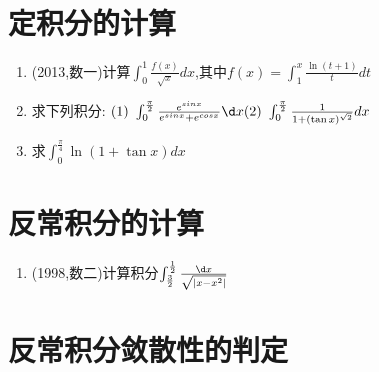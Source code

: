 \documentclass[12pt, a4paper, oneside, UTF8]{ctexbook}
\begin{document}
\section{ 定积分的计算}

\begin{enumerate}[label=\arabic*.,start=7]
    \item (2013,数一)计算$\int_0^1\frac{f(x)}{\sqrt{x}} dx$,其中$f(x)=\int_1^x\frac{\ln(t+1)}{t} dt$
    
    \begin{solution}
    \newpage
    \end{solution}
    
    \item  求下列积分:
    $
        (1)\ \int_{0}^{\frac{\pi}{2}}\frac{e^{sin x}}{e^{sin x}+e^{cos x}}\d x \\
        (2)\ \int_0^{\frac{\pi}{2}}\frac{1}{1+(\tan x)^{\sqrt{2}}} dx
    $
    \begin{solution}
    \newpage
    \end{solution}
    
    \item  求$\int_0^{\frac{\pi}{4}}\ln(1+\tan x) dx$
    
    \begin{solution}
    \newpage
    \end{solution}
\end{enumerate}

\section{ 反常积分的计算}

\begin{enumerate}[label=\arabic*.,start=10]
    \item (1998,数二)计算积分$\int_{\frac{3}{2}}^{\frac{1}{2}}\frac{\d x}{\sqrt{\left|x-x^2\right|}}$
    
    \begin{solution}
    \newpage
    \end{solution}
\end{enumerate}

\section{ 反常积分敛散性的判定}
\end{document}
